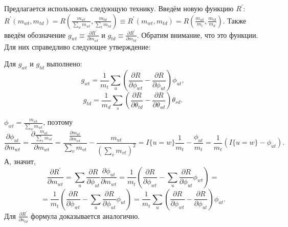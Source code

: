 \documentclass[12pt, twoside]{article}
\begin{document}
Предлагается использовать следующую технику. Введём новую функцию $R^{\prime}$: $R^{\prime}(m_{wt}, m_{td}) = R\left( \frac{m_{wt}}{\sum\limits_w m_{wt}},  \frac{m_{td}}{\sum\limits_t m_{td}}\right) \equiv R^{\prime}(m_{wt}, m_{td}) = R\left( \frac{m_{wt}}{m_t},  \frac{m_{td}}{m_d}\right)$. Также введём обозначение $g_{wt} \equiv \frac{\partial{R^{\prime}}}{\partial{m_{wt}}}$ и $g_{td} \equiv \frac{\partial{R^{\prime}}}{\partial{m_{td}}}$. Обратим внимание, что это функции. Для них справедливо следующее утверждение:
\begin{State}
\label{Stategradientvalue}           
Для $g_{wt}$ и $g_{td}$ выполнено:
\[
g_{wt} = \frac{1}{m_t} \sum_{u} \left(\frac{\partial{R}}{\partial{\phi_{wt}}}  -  \frac{\partial{R}}{\partial{\phi_{ut}}} \right)  \phi_{ut} ,
\]
\[
g_{td} = \frac{1}{m_d} \sum_{s} \left(\frac{\partial{R}}{\partial{\theta_{td}}}  -  \frac{\partial{R}}{\partial{\theta_{sd}}} \right)  \theta_{sd} .
\]
\end{State}
\begin{Proof}
$\phi_{wt} = \frac{m_{wt}}{\sum_w m_{wt}}$, поэтому
\[
\frac{\partial{\phi_{ut}}}{\partial{m_{wt}}} = \frac{\partial{ \frac{m_{ut}}{\sum\limits_v m_{vt}}}}{\partial{m_{wt}}} = \frac{ \frac{\partial{m_{ut}}}{\partial{m_{wt}}}}{\sum\limits_v m_{vt}} - \frac{m_{ut}}{(\sum\limits_v m_{vt})^2} = I\{u = w\} \frac{1}{m_t} - \frac{\phi_{ut}}{m_t} = \frac{1}{m_t}\left( 
 I\{u = w\} - \phi_{ut} \right).
\]
А, значит,
\[
\frac{\partial{R^{\prime}}}{\partial{m_{wt}}} = \sum_{u} \frac{\partial{R}}{\partial{\phi_{ut}}} \frac{\partial{\phi_{ut}}}{\partial{m_{wt}}} = \frac{1}{m_t} \left( \frac{\partial{R}}{\partial{\phi_{wt}}} - \sum_{u}  \frac{\partial{R}}{\partial{\phi_{ut}}} \phi_{wt} \right) = 
\]
\[
=\frac{1}{m_t} \left( \frac{\partial{R}}{\partial{\phi_{wt}}} - \sum_{u}  \frac{\partial{R}}{\partial{\phi_{ut}}} \phi_{ut} \right) = \frac{1}{m_t} \sum_{u} \left(\frac{\partial{R}}{\partial{\phi_{wt}}}  -  \frac{\partial{R}}{\partial{\phi_{ut}}} \right)  \phi_{ut}.
\]
Для $\frac{\partial{R^{\prime}}}{\partial{n_{td}}}$ формула доказывается аналогично.
\end{Proof}
\medskip
\end{document}
